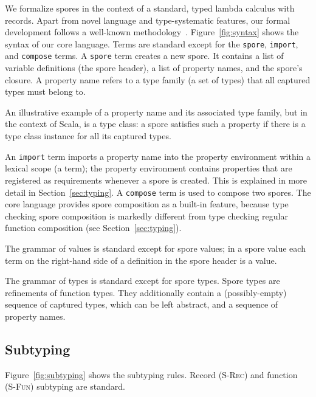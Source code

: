 \documentclass{llncs}
\begin{document}
We formalize spores in the context of a standard, typed lambda calculus with records. Apart from novel language and type-systematic features, our formal development follows a well-known methodology~\cite{TAPL}. Figure~\ref{fig:syntax} shows the syntax of our core language. Terms are standard except for the \texttt{spore}, \texttt{import}, and \texttt{compose} terms. A \texttt{spore} term creates a new spore. It contains a list of variable definitions (the spore header), a list of property names, and the spore's closure. A property name refers to a type family (a set of types) that all captured types must belong to.

An illustrative example of a property name and its associated type family, but in the context of Scala, is a type class: a spore satisfies such a property if there is a type class instance for all its captured types.

An \texttt{import} term imports a property name into the property environment within a lexical scope (a term); the property environment contains properties that are registered as requirements whenever a spore is created. This is explained in more detail in Section~\ref{sec:typing}. A \texttt{compose} term is used to compose two spores. The core language provides spore composition as a built-in feature, because type checking spore composition is markedly different from type checking regular function composition (see Section~\ref{sec:typing}).

The grammar of values is standard except for spore values; in a spore value each term on the right-hand side of a definition in the spore header is a value.

The grammar of types is standard except for spore types. Spore types are refinements of function types. They additionally contain a (possibly-empty) sequence of captured types, which can be left abstract, and a sequence of property names.

\subsection{Subtyping}\label{sec:subtyping}

Figure~\ref{fig:subtyping} shows the subtyping rules. Record (\textsc{S-Rec}) and function (\textsc{S-Fun}) subtyping are standard.
\end{document}

